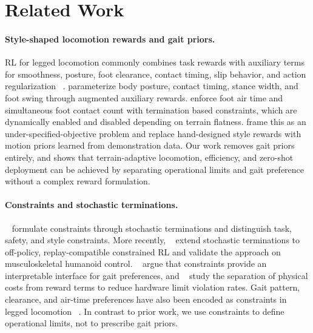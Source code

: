 \documentclass{article}
\begin{document}
    \section{Related Work}
    \label{sec:related-work}
    
    \paragraph{Style-shaped locomotion rewards and gait priors.} RL for legged locomotion commonly combines task rewards with auxiliary terms for smoothness, posture, foot clearance, contact timing, slip behavior, and action regularization ~\citep{rudinLearningWalkMinutes2022a,margolisWalkTheseWays2023,leeLearningQuadrupedalLocomotion2020,zhuangRobotParkourLearning2023}. \citet{margolisWalkTheseWays2023} parameterize body posture, contact timing, stance width, and foot swing through augmented auxiliary rewards. \citet{chane-saneCaTConstraintsTerminations2024a} enforce foot air time and simultaneous foot contact count with termination based constraints, which are dynamically enabled and disabled depending on terrain flatness. \citet{escontrelaAdversarialMotionPriors2022} frame this as an under-specified-objective problem and replace hand-designed style rewards with motion priors learned from demonstration data.
    Our work removes gait priors entirely, and shows that terrain-adaptive locomotion, efficiency, and zero-shot deployment can be achieved by separating operational limits and gait preference without a complex reward formulation.
    
    \paragraph{Constraints and stochastic terminations.}  ~\citet{chane-saneCaTConstraintsTerminations2024a} formulate constraints through stochastic terminations and distinguish task, safety, and style constraints. More recently, ~\citet{milosevic2026sdh} extend stochastic terminations to off-policy, replay-compatible constrained RL and validate the approach on musculoskeletal humanoid control. ~\citet{kimNotOnlyRewards2024a} argue that constraints provide an interpretable interface for gait preferences, and ~\citet{leeExploringConstrainedReinforcement2024} study the separation of physical costs from reward terms to reduce hardware limit violation rates. Gait pattern, clearance, and air-time preferences have also been encoded as constraints in legged locomotion ~\citep{gangapurwalaGuidedConstrainedPolicy2020a,kimNotOnlyRewards2024a}. In contrast to prior work, we use constraints to define operational limits, not to prescribe gait priors.
    
\end{document}
